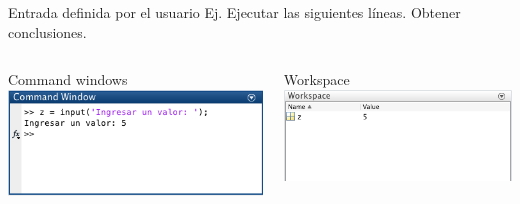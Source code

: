 \documentclass{bredelebeamer}
\begin{document}
\begin{frame}{Entrada definida por el usuario}
Ej. Ejecutar las siguientes líneas. Obtener conclusiones.

\begin{columns}
\begin{column}{0.5\textwidth}
\begin{center}
Command windows
\includegraphics[scale=0.3]{images/pantalla1.png}
\end{center}
\end{column}
\begin{column}{0.3\textwidth}
\begin{center}
Workspace
\includegraphics[scale=0.3]{images/pantalla2.png}
\end{center}
\end{column}
\end{columns}
\end{frame}
\end{document}

